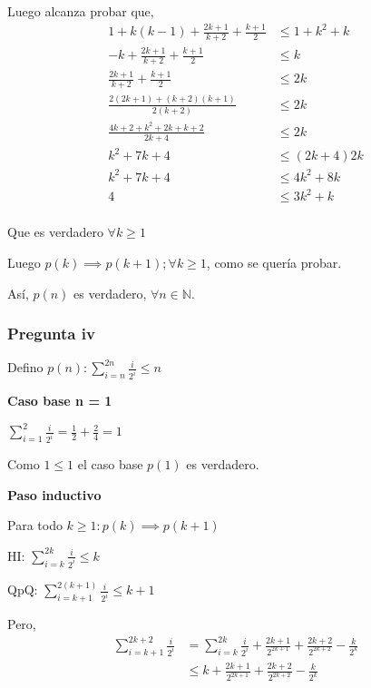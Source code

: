 Luego alcanza probar que,
\begin{align*}
    1+k(k-1) + \frac{2k+1}{k+2} + \frac{k+1}{2} &\leq 1+k^2 + k \\
    - k + \frac{2k+1}{k+2} + \frac{k+1}{2} &\leq k \\
    \frac{2k+1}{k+2} + \frac{k+1}{2} &\leq 2k \\
    \frac{2(2k+1) + (k+2)(k+1)}{2(k+2)} &\leq 2k \\
    \frac{4k+2 + k^2+2k+k+2}{2k+4} &\leq 2k \\
    k^2 + 7k + 4 &\leq (2k+4)2k \\
    k^2 + 7k + 4 &\leq 4k^2 + 8k \\
    4 &\leq 3k^2 + k\\
\end{align*}

Que es verdadero $\forall k \geq 1$

Luego $p(k) \implies p(k+1); \forall k \geq 1$, como se quería probar.

Así, $p(n)$ es verdadero, $\forall n \in \mathbb{N}$.

\subsubsection{Pregunta iv}

Defino $ p(n): \sum_{i=n}^{2n}\frac{i}{2^i} \leq n$

\textbf{Caso base n = 1}

$ \sum_{i=1}^{2}\frac{i}{2^i} = \frac{1}{2} + \frac{2}{4} = 1 $

Como $ 1 \leq 1 $ el caso base $p(1)$ es verdadero.

\textbf{Paso inductivo}

Para todo $k \geq 1: p(k) \implies p(k+1)$

HI: $\sum_{i=k}^{2k}\frac{i}{2^i} \leq k$

QpQ: $ \sum_{i=k+1}^{2(k+1)}\frac{i}{2^i} \leq k+1$

Pero,
\begin{align*}
    \sum_{i=k+1}^{2k+2}\frac{i}{2^i} &= \sum_{i=k}^{2k}\frac{i}{2^i} + \frac{2k+1}{2^{2k+1}}+ \frac{2k+2}{2^{2k+2}} - \frac{k}{2^k} \\
    &\leq k + \frac{2k+1}{2^{2k+1}}+ \frac{2k+2}{2^{2k+2}} - \frac{k}{2^k} \\
\end{align*}

